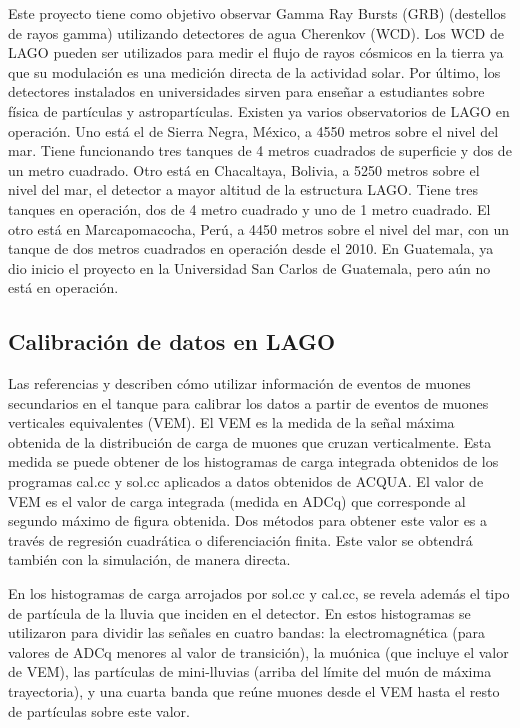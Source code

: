 \documentclass{book}
\begin{document}
Este proyecto tiene como objetivo observar Gamma Ray Bursts (GRB) (destellos de rayos gamma) utilizando detectores de agua Cherenkov (WCD). Los WCD de LAGO pueden ser utilizados para medir el flujo de rayos c\'osmicos en la tierra ya que su modulaci\'on es una medici\'on directa de la actividad solar. Por \'ultimo, los detectores instalados en universidades sirven para ense\~nar a estudiantes sobre f\'isica de part\'iculas y astropart\'iculas. Existen ya varios observatorios de LAGO en operaci\'on. Uno est\'a el de Sierra Negra, M\'exico, a 4550 metros sobre el nivel del mar. Tiene funcionando tres tanques de 4 metros cuadrados de superficie y dos de un metro cuadrado. Otro est\'a en Chacaltaya, Bolivia, a 5250 metros sobre el nivel del mar, el detector a mayor altitud de la estructura LAGO. Tiene tres tanques en operaci\'on, dos de 4 metro cuadrado y uno de 1 metro cuadrado. El otro est\'a en Marcapomacocha, Per\'u, a 4450 metros sobre el nivel del mar, con un tanque de dos metros cuadrados en operaci\'on desde el 2010. En Guatemala, ya dio inicio el proyecto en la Universidad San Carlos de Guatemala, pero a\'un no est\'a en operaci\'on. \citep{VILLASENOR}

\subsection{Calibraci\'on de datos en LAGO}

Las referencias \citep{ALLISON} y \citep{ALARCON} describen c\'omo utilizar informaci\'on de eventos de muones secundarios en el tanque para calibrar los datos a partir de eventos de muones verticales equivalentes (VEM). El VEM es la medida de la se\~nal m\'axima obtenida de la distribuci\'on de carga de muones que cruzan verticalmente. Esta medida se puede obtener de los histogramas de carga integrada obtenidos de los programas cal.cc y sol.cc aplicados a datos obtenidos de ACQUA. El valor de VEM es el valor de carga integrada (medida en ADCq) que corresponde al segundo m\'aximo de figura obtenida. Dos m\'etodos para obtener este valor es a trav\'es de regresi\'on cuadr\'atica o diferenciaci\'on finita. Este valor se obtendr\'a tambi\'en con la simulaci\'on, de manera directa.

En los histogramas de carga arrojados por sol.cc y cal.cc, se revela adem\'as el tipo de part\'icula de la lluvia que inciden en el detector. En \citep{ASOREY} estos histogramas se utilizaron para dividir las se\~nales en cuatro bandas: la electromagn\'etica (para valores de ADCq menores al valor de transici\'on), la mu\'onica (que incluye el valor de VEM), las part\'iculas de mini-lluvias (arriba del l\'imite del mu\'on de m\'axima trayectoria), y una cuarta banda que re\'une muones desde el VEM hasta el resto de part\'iculas sobre este valor. \citep{Yunior}
\end{document}
